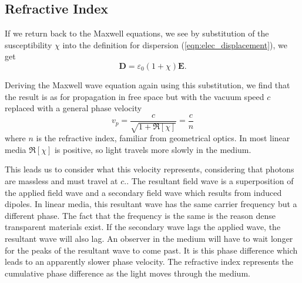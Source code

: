   \subsection{Refractive Index}

    If we return back to the Maxwell equations, we see by substitution of the
    susceptibility $\chi$ into the definition for dispersion
    (\ref{eqn:elec_displacement}), we get
    \begin{equation}
        \mathbf{D} = \varepsilon_0 (1 + \chi) \mathbf{E}.
    \end{equation}

    Deriving the Maxwell wave equation again using this substitution, we find
    that the result is as for propagation in free space but with the vacuum
    speed $c$ replaced with a general phase velocity      
    \begin{equation}
        v_p = \frac{c}{\sqrt{1 + \Re \left[ \chi \right] }} = \frac{c}{n}
        \label{eqn:phase_vel_refr}
    \end{equation}
    where $n$ is the refractive index, familiar from geometrical optics. In most
    linear media $\Re \left[ \chi \right]$ is positive, so light travels more
    slowly in the medium.\cite{James1992}

    This leads us to consider what this velocity represents, considering that
    photons are massless and must travel at $c$.\cite{feynman1963feynman}. The
    resultant field wave is a superposition of the applied field wave and a
    secondary field wave which results from induced dipoles. In linear media,
    this resultant wave has the same carrier frequency but a different phase.
    The fact that the frequency is the same is the reason dense transparent
    materials exist. If the secondary wave lags the applied wave, the resultant
    wave will also lag. An observer in the medium will have to wait longer for
    the peaks of the resultant wave to come past. It is this phase difference
    which leads to an apparently slower phase velocity. The refractive index
    represents the cumulative phase difference as the light moves through the
    medium.\cite{hecht2015optics}

  
